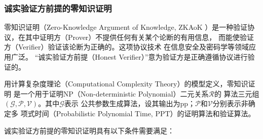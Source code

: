 \documentclass[zihao=-4]{ctexart}
\begin{document}
\subsubsection{诚实验证方前提的零知识证明}
零知识证明（Zero-Knowledge Argument of Knowledge, ZKAoK
）是一种验证协议，在其中证明方（Prover）不提供任何有关某个论断的有用信息，
而能使验证方（Verifier）验证该论断为正确的。这项协议技术
在信息安全及密码学等领域应用广泛。
“诚实验证方前提（Honest Verifier）”意为验证方是正确遵循协议进行验证的。\par
用计算复杂度理论（Computational Complexity Theory）的模型定义，零知识证明
是一个用于证明NP（Non-deterministic Polynomial）二元关系$\mathcal{R}$的
算法三元组$(\mathcal{G}, \mathcal{P}, \mathcal{V})$。其中$\mathcal{G}$表示
公共参数生成算法，设其输出为pp；$\mathcal{P}$和$\mathcal{V}$分别表示非确定多
项式时间（Probabilistic Polynomial Time, PPT）的证明算法和验证算法。\par
诚实验证方前提的零知识证明\cite{Fourty-two}具有以下条件需要满足：
\end{document}
